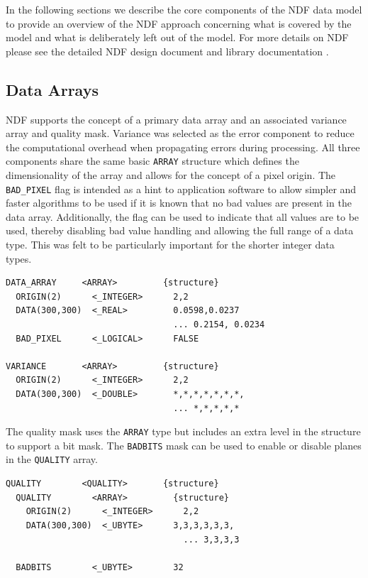 \documentclass[final,authoryear,5p,times,twocolumn]{elsarticle}
\begin{document}
In the following sections we describe the core components of the NDF
data model to provide an overview of the NDF approach concerning what
is covered by the model and what is deliberately left out of the
model. For more details on NDF please see the detailed NDF design
document \citep[SGP/38;][]{SGP38} and library documentation \citep[SUN/33;][]{SUN33}.

\subsection{Data Arrays}

NDF supports the concept of a primary data array and an associated
variance array and quality mask. Variance was selected as the error
component to reduce the computational overhead when propagating errors
during processing. All three components share the same
basic \texttt{ARRAY} structure which defines the dimensionality of the
array and allows for the concept of a pixel origin. The
\texttt{BAD\_PIXEL} flag is intended as a hint to application
software to allow simpler and faster algorithms to be used if it is known
that no bad values are present in the data array. Additionally, the flag
can be used to indicate that all values are to be used, thereby
disabling bad value handling and allowing the full range of a data
type. This was felt to be particularly important for the shorter
integer data types.

{\small
\begin{verbatim}
DATA_ARRAY     <ARRAY>         {structure}
  ORIGIN(2)      <_INTEGER>      2,2
  DATA(300,300)  <_REAL>         0.0598,0.0237
                                 ... 0.2154, 0.0234
  BAD_PIXEL      <_LOGICAL>      FALSE

VARIANCE       <ARRAY>         {structure}
  ORIGIN(2)      <_INTEGER>      2,2
  DATA(300,300)  <_DOUBLE>       *,*,*,*,*,*,*,
                                 ... *,*,*,*,*
\end{verbatim}
}

The quality mask uses the \texttt{ARRAY} type but includes an extra
level in the structure to support a bit mask. The \texttt{BADBITS}
mask can be used to enable or disable planes in the \texttt{QUALITY} array.

{\small
\begin{verbatim}
QUALITY        <QUALITY>       {structure}
  QUALITY        <ARRAY>         {structure}
    ORIGIN(2)      <_INTEGER>      2,2
    DATA(300,300)  <_UBYTE>      3,3,3,3,3,3,
                                   ... 3,3,3,3

  BADBITS        <_UBYTE>        32
\end{verbatim}
}
\end{document}
